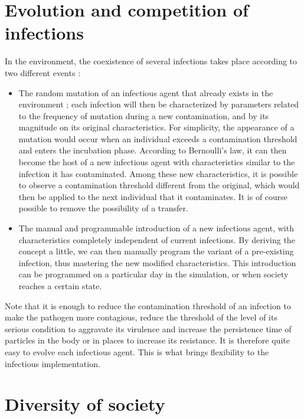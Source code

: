 \section{Evolution and competition of infections}

In the environment, the coexistence of several infections takes place according to two different events :\\

\begin{itemize}
\item The random mutation of an infectious agent that already exists in the environment ; each infection will then be characterized by parameters related to the frequency of mutation during a new contamination, and by its magnitude on its original characteristics. For simplicity, the appearance of a mutation would occur when an individual exceeds a contamination threshold and enters the incubation phase. According to Bernoulli's law, it can then become the host of a new infectious agent with characteristics similar to the infection it has contaminated. Among these new characteristics, it is possible to observe a contamination threshold different from the original, which would then be applied to the next individual that it contaminates. It is of course possible to remove the possibility of a transfer.
\item The manual and programmable introduction of a new infectious agent, with characteristics completely independent of current infections. By deriving the concept a little, we can then manually program the variant of a pre-existing infection, thus mastering the new modified characteristics. This introduction can be programmed on a particular day in the simulation, or when society reaches a certain state.\\
\end{itemize}

Note that it is enough to reduce the contamination threshold of an infection to make the pathogen more contagious, reduce the threshold of the level of its serious condition to aggravate its virulence and increase the persistence time of particles in the body or in places to increase its resistance. It is therefore quite easy to evolve each infectious agent. This is what brings flexibility to the infectious implementation.\\

\newpage

\section{Diversity of society}

